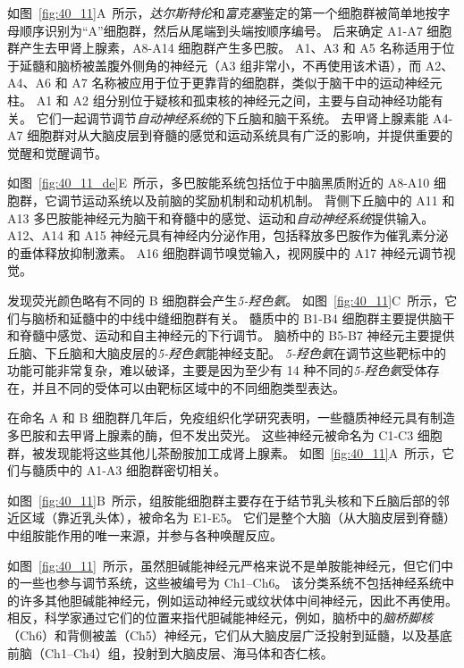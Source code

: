 如图~\ref{fig:40_11}A~所示，\textit{达尔斯特伦}和\textit{富克塞}鉴定的第一个细胞群被简单地按字母顺序识别为“A”细胞群，然后从尾端到头端按顺序编号。
后来确定 A1-A7 细胞群产生去甲肾上腺素，A8-A14 细胞群产生多巴胺。
A1、A3 和 A5 名称适用于位于延髓和脑桥被盖腹外侧角的神经元（A3 组非常小，不再使用该术语），而 A2、A4、A6 和 A7 名称被应用于位于更靠背的细胞群，类似于脑干中的运动神经元柱。
A1 和 A2 组分别位于疑核和孤束核的神经元之间，主要与自动神经功能有关。
它们一起调节调节\textit{自动神经系统}的下丘脑和脑干系统。
去甲肾上腺素能 A4-A7 细胞群对从大脑皮层到脊髓的感觉和运动系统具有广泛的影响，并提供重要的觉醒和觉醒调节。


如图~\ref{fig:40_11_de}E~所示，多巴胺能系统包括位于中脑黑质附近的 A8-A10 细胞群，它调节运动系统以及前脑的奖励机制和动机机制。
背侧下丘脑中的 A11 和 A13 多巴胺能神经元为脑干和脊髓中的感觉、运动和\textit{自动神经系统}提供输入。
A12、A14 和 A15 神经元具有神经内分泌作用，包括释放多巴胺作为催乳素分泌的垂体释放抑制激素。
A16 细胞群调节嗅觉输入，视网膜中的 A17 神经元调节视觉。


发现荧光颜色略有不同的 B 细胞群会产生\textit{5-羟色氨}。
如图~\ref{fig:40_11}C~所示，它们与脑桥和延髓中的中线中缝细胞群有关。
髓质中的 B1-B4 细胞群主要提供脑干和脊髓中感觉、运动和自主神经元的下行调节。
脑桥中的 B5-B7 神经元主要提供丘脑、下丘脑和大脑皮层的\textit{5-羟色氨}能神经支配。
\textit{5-羟色氨}在调节这些靶标中的功能可能非常复杂，难以破译，主要是因为至少有 14 种不同的\textit{5-羟色氨}受体存在，并且不同的受体可以由靶标区域中的不同细胞类型表达。


在命名 A 和 B 细胞群几年后，免疫组织化学研究表明，一些髓质神经元具有制造多巴胺和去甲肾上腺素的酶，但不发出荧光。
这些神经元被命名为 C1-C3 细胞群，被发现能将这些其他儿茶酚胺加工成肾上腺素。
如图~\ref{fig:40_11}A~所示，它们与髓质中的 A1-A3 细胞群密切相关。


如图~\ref{fig:40_11}B~所示，组胺能细胞群主要存在于结节乳头核和下丘脑后部的邻近区域（靠近乳头体），被命名为 E1-E5。
它们是整个大脑（从大脑皮层到脊髓）中组胺能作用的唯一来源，并参与各种唤醒反应。


如图~\ref{fig:40_11}~所示，虽然胆碱能神经元严格来说不是单胺能神经元，但它们中的一些也参与调节系统，这些被编号为 Ch1–Ch6。
该分类系统不包括神经系统中的许多其他胆碱能神经元，例如运动神经元或纹状体中间神经元，因此不再使用。
相反，科学家通过它们的位置来指代胆碱能神经元，例如，脑桥中的\textit{脑桥脚核}（Ch6）和背侧被盖（Ch5）神经元，它们从大脑皮层广泛投射到延髓，以及基底前脑（Ch1–Ch4）组，投射到大脑皮层、海马体和杏仁核。



